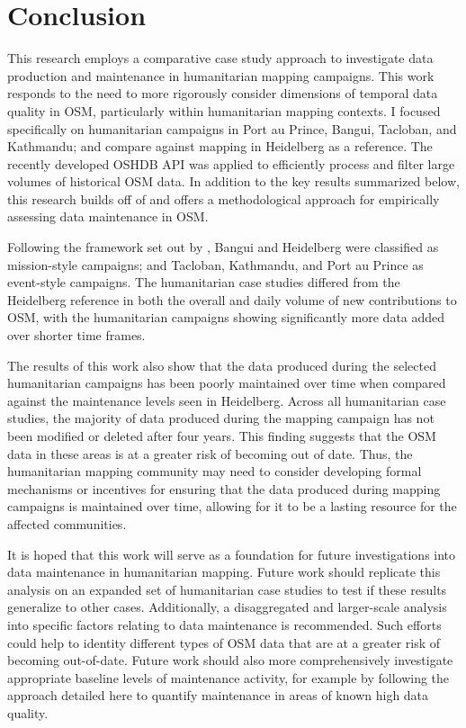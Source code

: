 \chapter{Conclusion}
\label{chapterlabel7}

This research employs a comparative case study approach to investigate data production and maintenance in humanitarian mapping campaigns. This work responds to the need to more rigorously consider dimensions of temporal data quality in OSM, particularly within humanitarian mapping contexts. I focused specifically on humanitarian campaigns in Port au Prince, Bangui, Tacloban, and Kathmandu; and compare against mapping in Heidelberg as a reference. The recently developed OSHDB API \parencite{raifer_oshdb_2019} was applied to efficiently process and filter large volumes of historical OSM data. In addition to the key results summarized below, this research builds off of \textcite{quattrone_work_2017} and offers a methodological approach for empirically assessing data maintenance in OSM.  

Following the framework set out by \textcite{dittus_mass_2017}, Bangui and Heidelberg were classified as mission-style campaigns; and Tacloban, Kathmandu, and Port au Prince as event-style campaigns. The humanitarian case studies differed from the Heidelberg reference in both the overall and daily volume of new contributions to OSM, with the humanitarian campaigns showing significantly more data added over shorter time frames. 

The results of this work also show that the data produced during the selected humanitarian campaigns has been poorly maintained over time when compared against the maintenance levels seen in Heidelberg. Across all humanitarian case studies, the majority of data produced during the mapping campaign has not been modified or deleted after four years. This finding suggests that the OSM data in these areas is at a greater risk of becoming out of date. Thus, the humanitarian mapping community may need to consider developing formal mechanisms or incentives for ensuring that the data produced during mapping campaigns is maintained over time, allowing for it to be a lasting resource for the affected communities. 

It is hoped that this work will serve as a foundation for future investigations into data maintenance in humanitarian mapping. Future work should replicate this analysis on an expanded set of humanitarian case studies to test if these results generalize to other cases. Additionally, a disaggregated and larger-scale analysis into specific factors relating to data maintenance is recommended. Such efforts could help to identity different types of OSM data that are at a greater risk of becoming out-of-date. Future work should also more comprehensively investigate appropriate baseline levels of maintenance activity, for example by following the approach detailed here to quantify maintenance in areas of known high data quality.

